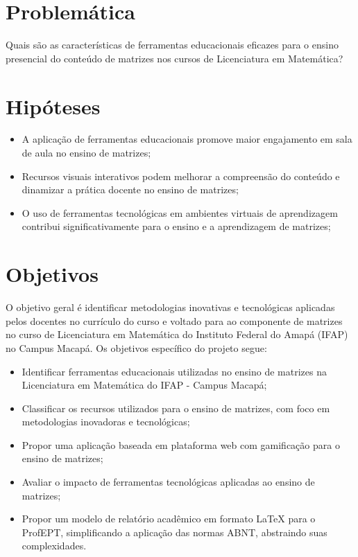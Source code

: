 \section{Problemática}

Quais são as características de ferramentas educacionais eficazes para o ensino presencial do conteúdo de matrizes nos cursos de Licenciatura em Matemática?



\section{Hipóteses}
\label{sec:hipoteses}

\begin{itemize}
    \item A aplicação de ferramentas educacionais promove maior engajamento em sala de aula no ensino de matrizes;
    \item Recursos visuais interativos podem melhorar a compreensão do conteúdo e dinamizar a prática docente no ensino de matrizes;
    \item O uso de ferramentas tecnológicas em ambientes virtuais de aprendizagem contribui significativamente para o ensino e a aprendizagem de matrizes;
\end{itemize}



\section{Objetivos}
\label{objetivos}


O objetivo geral é identificar metodologias inovativas e tecnológicas aplicadas pelos docentes no currículo do curso e voltado para ao componente de matrizes no curso de Licenciatura em Matemática do Instituto Federal do Amapá (IFAP) no Campus Macapá. Os objetivos específico do projeto segue:

\begin{itemize}
    \item Identificar ferramentas educacionais utilizadas no ensino de matrizes na Licenciatura em Matemática do IFAP - Campus Macapá;

    \item Classificar os recursos utilizados para o ensino de matrizes, com foco em metodologias inovadoras e tecnológicas;

    \item Propor uma aplicação baseada em plataforma web com gamificação para o ensino de matrizes;
    
    \item Avaliar o impacto de ferramentas tecnológicas aplicadas ao ensino de matrizes;
    
    \item Propor um modelo de relatório acadêmico em formato LaTeX para o ProfEPT, simplificando a aplicação das normas ABNT, abstraindo suas complexidades.
\end{itemize}




